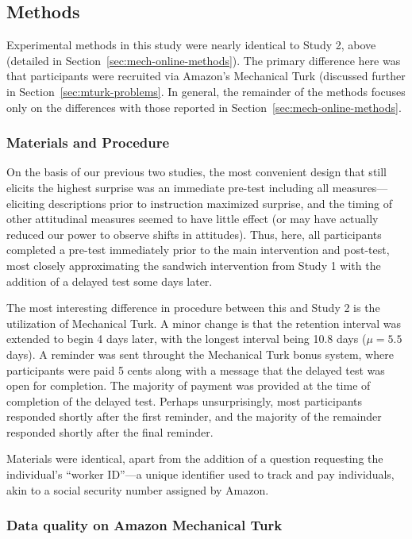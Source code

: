 \subsection{Methods}

Experimental methods in this study were nearly identical to Study 2, above
(detailed in Section~\ref{sec:mech-online-methods}). The primary difference here
was that participants were recruited via Amazon's Mechanical Turk (discussed
further in Section~\ref{sec:mturk-problems}. In general, the remainder of the
methods focuses only on the differences with those reported in
Section~\ref{sec:mech-online-methods}.

\subsubsection{Materials and Procedure}

On the basis of our previous two studies, the most convenient design that still
elicits the highest surprise was an immediate pre-test including all
measures---eliciting descriptions prior to instruction maximized surprise, and
the timing of other attitudinal measures seemed to have little effect (or may
have actually reduced our power to observe shifts in attitudes). Thus, here, all
participants completed a pre-test immediately prior to the main intervention and
post-test, most closely approximating the sandwich intervention from Study 1
with the addition of a delayed test some days later.

The most interesting difference in procedure between this and Study 2 is the
utilization of Mechanical Turk. A minor change is that the retention interval
was extended to begin 4 days later, with the longest interval being 10.8 days
($\mu=5.5$ days). A reminder was sent throught the Mechanical Turk bonus system,
where participants were paid 5 cents along with a message that the delayed test
was open for completion. The majority of payment was provided at the time of
completion of the delayed test. Perhaps unsurprisingly, most participants
responded shortly after the first reminder, and the majority of the remainder
responded shortly after the final reminder.

Materials were identical, apart from the addition of a question requesting the
individual's “worker ID”---a unique identifier used to track and pay
individuals, akin to a social security number assigned by Amazon.

\subsubsection{Data quality on Amazon Mechanical Turk}

